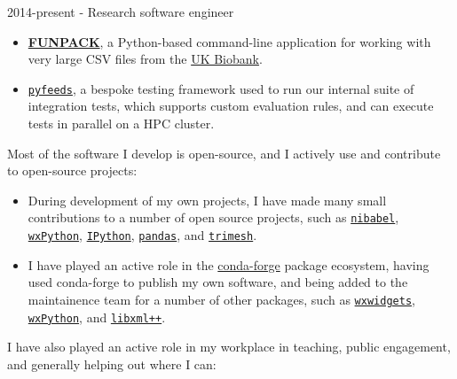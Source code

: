 \documentclass{resume}
\begin{document}
\begin{category}{2014-present - Research software engineer}
\begin{itemize}
supporting legacy code that was written against the \href{https://www.robertnz.net/nm_intro.htm}{Newmat} linear algebra library but which, under the hood, uses
the more modern \href{https://arma.sourceforge.net}{Armadillo} linear algebra
library.
\item \href{https://pages.fmrib.ox.ac.uk/fsl/funpack/}{\textbf{FUNPACK}}, a Python-based command-line
application for working with very large CSV files from the \href{https://www.ukbiobank.ac.uk/}{UK Biobank}.
\item \href{https://git.fmrib.ox.ac.uk/fsl/pyfeeds}{\texttt{pyfeeds}}, a bespoke testing framework used
to run our internal suite of integration tests, which supports custom
evaluation rules, and can execute tests in parallel on a HPC cluster.
\end{itemize}\leavevmode\newline

Most of the software I develop is open-source, and I actively use and
contribute to open-source projects:\newline

\begin{itemize}
\item During development of my own projects, I have made many small
contributions to a number of open source projects, such as \href{https://github.com/nipy/nibabel/pulls?q=is%3Apr+author%3Apauldmccarthy}{\texttt{nibabel}}, \href{https://github.com/wxWidgets/Phoenix/pulls?q=is%3Apr+author%3Apauldmccarthy}{\texttt{wxPython}},
\href{https://github.com/ipython/ipython/pulls?q=is%3Apr+author%3Apauldmccarthy}{\texttt{IPython}}, \href{https://github.com/pandas-dev/pandas/pull/40180}{\texttt{pandas}},
and \href{https://github.com/mikedh/trimesh/pulls?q=is%3Apr+pauldmccarthy}{\texttt{trimesh}}.
\item I have played an active role in the \href{https://conda-forge.org/}{conda-forge} package ecosystem, having used conda-forge to
publish my own software, and being added to the maintainence team for
a number of other packages, such as \href{https://github.com/conda-forge/wxwidgets-feedstock}{\texttt{wxwidgets}}, \href{https://github.com/conda-forge/wxpython-feedstock}{\texttt{wxPython}}, and \href{https://github.com/conda-forge/libxmlpp-feedstock}{\texttt{libxml++}}.
\end{itemize}\leavevmode\newline

I have also played an active role in my workplace in teaching,
public engagement, and generally helping out where I can:\newline


\end{category}
\end{document}
